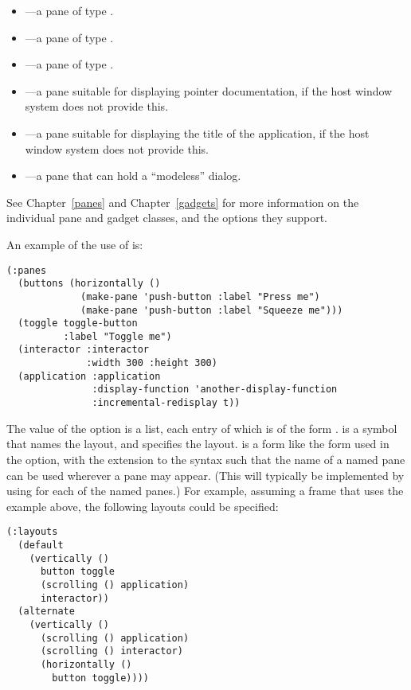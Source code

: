 \begin{itemize}
\item {}---a pane of type .

\item {}---a pane of type .

\item {}---a pane of type .

\item {}---a pane suitable for displaying pointer
documentation, if the host window system does not provide this.

\item {}---a pane suitable for displaying the title of the application,
if the host window system does not provide this.

\item {}---a pane that can hold a ``modeless''
 dialog.
\end{itemize}

See Chapter~\ref{panes} and Chapter~\ref{gadgets} for more information on the
individual pane and gadget classes, and the options they support.

An example of the use of  is:

\begin{verbatim}
(:panes
  (buttons (horizontally ()
             (make-pane 'push-button :label "Press me")
             (make-pane 'push-button :label "Squeeze me")))
  (toggle toggle-button 
          :label "Toggle me")
  (interactor :interactor
              :width 300 :height 300)
  (application :application
               :display-function 'another-display-function
               :incremental-redisplay t))
\end{verbatim}

The value of the  option is a list, each entry of which is of the
form .   is a symbol that names the layout, and
 specifies the layout.   is a form like the form used in
the  option, with the extension to the syntax such that the name of a
named pane can be used wherever a pane may appear.  (This will typically be
implemented by using  for each of the named panes.)  For
example, assuming a frame that uses the  example above, the following
layouts could be specified:

\begin{verbatim}
(:layouts
  (default 
    (vertically ()
      button toggle 
      (scrolling () application)
      interactor))
  (alternate
    (vertically ()
      (scrolling () application)
      (scrolling () interactor)
      (horizontally ()
        button toggle))))
\end{verbatim}

